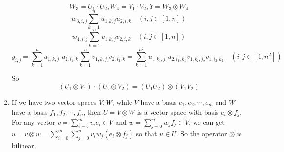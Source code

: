 \documentclass{article}
\begin{document}
\begin{enumerate}
$$W_3=U_1\cdot U_2, W_4=V_1\cdot V_2, Y=W_3\otimes W_4$$
$$w_{3,i,j}\sum_{k=1}^{n}u_{1,k,j}u_{2,i,k} \quad (i,j\in[1,n])$$
$$w_{4,i,j}\sum_{k=1}^{n}v_{1,k,j}v_{2,i,k} \quad (i,j\in[1,n])$$
$$y_{i,j}=\sum_{k=1}^{n}u_{1,k,j_1}u_{2,i_1,k}\sum_{k=1}^{n}v_{1,k,j_2}v_{2,i_2,k}=\sum_{k=1}^{n^2}u_{1,k_1,j_1}u_{2,i_1,k_1}v_{1,k_2,j_2}v_{1,i_2,k_2}  \quad (i,j\in[1,n^2])$$

So $$(U_1\otimes V_1)\cdot(U_2\otimes V_2)=(U_1U_2)\otimes(V_1V_2)$$

\item
If we have two vector spaces $V,W$, while $V$ have a basis $e_1,e_2,\cdots,e_m$ and $W$ have a basis $f_1,f_2,\cdots,f_n$, then $U=V\otimes W$ is a vector space with basis $e_i\otimes f_j$. For any vector $v=\sum_{i=0}^mv_ie_i\in V$ and $w=\sum_{j=0}^mw_jf_j\in V$, we can get $u=v\otimes w=\sum_{i=0}^{m}\sum_{j=0}^{n}v_iw_j (e_i\otimes f_j)$ so that $u\in U$. So the operator $\otimes$ is bilinear.

\end{enumerate}
\end{document}
